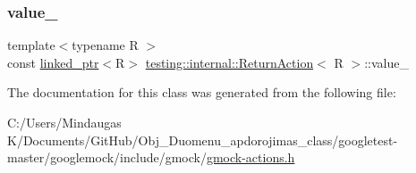\mbox{\label{classtesting_1_1internal_1_1_return_action_a321f509b255d1651234f53e8b064d98d}} 
\subsubsection{\texorpdfstring{value\_}{value\_}\hspace{0.1cm}{\footnotesize\ttfamily [2/2]}}
{\footnotesize\ttfamily template$<$typename R $>$ \\
const \mbox{\hyperlink{classtesting_1_1internal_1_1linked__ptr}{linked\+\_\+ptr}}$<$R$>$ \mbox{\hyperlink{classtesting_1_1internal_1_1_return_action}{testing\+::internal\+::\+Return\+Action}}$<$ R $>$\+::value\+\_\+\hspace{0.3cm}{\ttfamily [private]}}



The documentation for this class was generated from the following file\+:\begin{DoxyCompactItemize}
\item 
C\+:/\+Users/\+Mindaugas K/\+Documents/\+Git\+Hub/\+Obj\+\_\+\+Duomenu\+\_\+apdorojimas\+\_\+class/googletest-\/master/googlemock/include/gmock/\mbox{\hyperlink{googletest-master_2googlemock_2include_2gmock_2gmock-actions_8h}{gmock-\/actions.\+h}}\end{DoxyCompactItemize}

